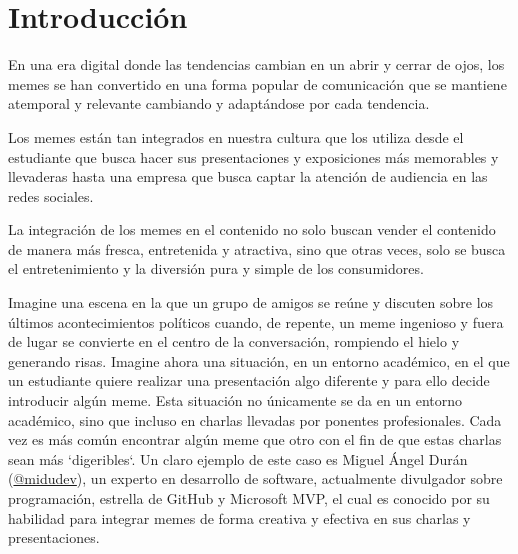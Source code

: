 \chapter{Introducción}

En una era digital donde las tendencias cambian en un abrir y cerrar de ojos, los memes se han convertido en una forma popular de comunicación que se mantiene atemporal y relevante cambiando y adaptándose por cada tendencia.

Los memes están tan integrados en nuestra cultura que los utiliza desde el estudiante que busca hacer sus presentaciones y exposiciones más memorables y llevaderas hasta una empresa que busca captar la atención de audiencia en las redes sociales.

La integración de los memes en el contenido no solo buscan vender el contenido de manera más fresca, entretenida y atractiva, sino que otras veces, solo se busca el entretenimiento y la diversión pura y simple de los consumidores.

Imagine una escena en la que un grupo de amigos se reúne y discuten sobre los últimos acontecimientos políticos cuando, de repente, un meme ingenioso y fuera de lugar se convierte en el centro de la conversación, rompiendo el hielo y generando risas. Imagine ahora una situación, en un entorno académico, en el que un estudiante quiere realizar una presentación algo diferente y para ello decide introducir algún meme. Esta situación no únicamente se da en un entorno académico, sino que incluso en charlas llevadas por ponentes profesionales. Cada vez es más común encontrar algún meme que otro con el fin de que estas charlas sean más `digeribles`. Un claro ejemplo de este caso es Miguel Ángel Durán (\href{https://midu.dev/}{@midudev}), un experto en desarrollo de software, actualmente divulgador sobre programación, estrella de GitHub y Microsoft MVP, el cual es conocido por su habilidad para integrar memes de forma creativa y efectiva en sus charlas y presentaciones.

